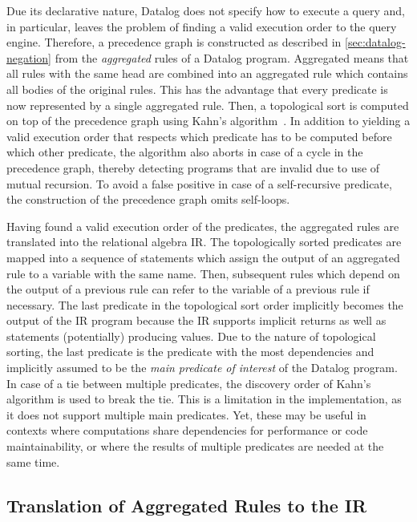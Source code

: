 Due its declarative nature, Datalog does not specify how to execute a query
and, in particular, leaves the problem of finding a valid execution order
to the query engine.
Therefore, a precedence graph is constructed as described in \ref{sec:datalog-negation}
from the \emph{aggregated} rules of a Datalog program.
Aggregated means that all rules with the same head are combined into an
aggregated rule which contains all bodies of the original rules.
This has the advantage that every predicate is now represented by a single
aggregated rule.
Then, a topological sort is computed on top of the precedence graph using
Kahn's algorithm~\cite{kahn1962topological}.
In addition to yielding a valid execution order that respects which predicate has
to be computed before which other predicate, the algorithm also aborts in
case of a cycle in the precedence graph, thereby detecting programs that are
invalid due to use of mutual recursion.
To avoid a false positive in case of a self-recursive predicate,
the construction of the precedence graph omits self-loops.

Having found a valid execution order of the predicates,
the aggregated rules are translated into the relational algebra \ac{IR}.
The topologically sorted predicates are mapped into a sequence of statements
which assign the output of an aggregated rule to a variable with the same name.
Then, subsequent rules which depend on the output of a previous rule can refer
to the variable of a previous rule if necessary.
The last predicate in the topological sort order implicitly becomes the output
of the \ac{IR} program because the \ac{IR} supports implicit returns as well as
statements (potentially) producing values.
Due to the nature of topological sorting, the last predicate is the
predicate with the most dependencies and implicitly assumed to be the
\emph{main predicate of interest} of the Datalog program.
In case of a tie between multiple predicates, the discovery order of Kahn's
algorithm is used to break the tie.
This is a limitation in the implementation, as it does not support multiple
main predicates.
Yet, these may be useful in contexts where computations share dependencies
for performance or code maintainability, or where the results of multiple
predicates are needed at the same time.

\subsection{Translation of Aggregated Rules to the \ac{IR}}

